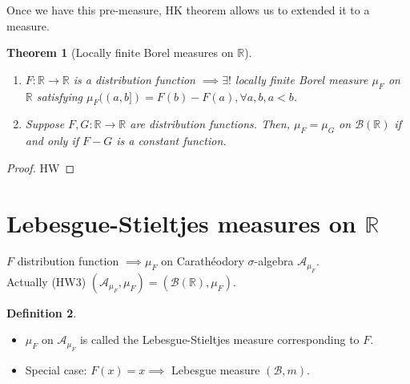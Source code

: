 \documentclass{report}
\newcommand{\R}{\mathbb{R}}
\newtheorem{theorem}{Theorem}[chapter]
\theoremstyle{definition}
\newtheorem{definition}[theorem]{Definition}
\theoremstyle{remark}
\newcommand{\fnl}{\parbox[t]{0\linewidth}{}}
\newcommand*\ttlmath[2]{\texorpdfstring{$\boldsymbol{#1}$}{#2}}
\begin{document}
Once we have this pre-measure, HK theorem allows us to extended it to a measure.

\begin{theorem}[Locally finite Borel measures on $\R$]\fnl
\begin{enumerate}
\item $F: \R \to \R$ is a distribution function $\implies \exists!$ locally finite Borel measure $\mu_F$ on $\R$ satisfying $\mu_F((a, b]) = F(b) - F(a), \forall a, b, a < b$.
\item Suppose $F, G: \R \to \R$ are distribution functions. Then, $\mu_F = \mu_G$ on $\mathcal{B}(\R)$ if and only if $F - G$ is a constant function.
\end{enumerate}
\end{theorem}
\begin{proof}
HW
\end{proof}

\section{Lebesgue-Stieltjes measures on \ttlmath{\R}{Reals}}
$F$ distribution function  $\implies \mu_F$ on Carathéodory $\sigma$-algebra $\mathcal{A}_{\mu_F}$.\\
Actually (HW3) $(\mathcal{A}_{\mu_F}, \mu_F) = (\mathcal{B}(\R), \mu_F)$.

\begin{definition}
\begin{itemize}
\item $\mu_F$ on $\mathcal{A}_{\mu_F}$ is called the Lebesgue-Stieltjes measure corresponding to $F$.
\item Special case: $F(x) = x \implies$ Lebesgue measure $(\mathcal{B}, m)$.
\end{itemize}
\end{definition} 
\end{document}
